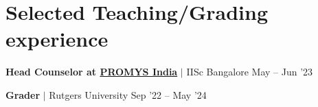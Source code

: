 \section{Selected Teaching/Grading experience}
\resumeSubHeadingListStart





\resumeProjectHeading
{\textbf{Head Counselor at \href{https://promys-india.org}{PROMYS India}} $|$ IISc Bangalore}
{May -- Jun '23}
\vspace{-20pt}

\resumeProjectHeading
{\textbf{Grader} $|$ Rutgers University}
{Sep '22 -- May '24}
\vspace{-20pt}



